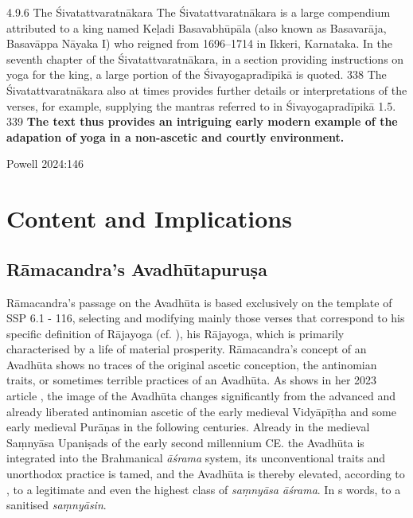 {4.9.6 The Śivatattvaratnākara
The Śivatattvaratnākara is a large compendium attributed to a king named Keḷadi Basavabhūpāla (also
known as Basavarāja, Basavāppa Nāyaka I) who reigned from 1696–1714 in Ikkeri, Karnataka. In the
seventh chapter of the Śivatattvaratnākara, in a section providing instructions on yoga for the king, a
large portion of the Śivayogapradīpikā is quoted. 338 The Śivatattvaratnākara also at times provides
further details or interpretations of the verses, for example, supplying the mantras referred to in
Śivayogapradīpikā 1.5. 339 \textbf{The text thus provides an intriguing early modern example of the adapation of
yoga in a non-ascetic and courtly environment.}

Powell 2024:146

\chapter{Content and Implications}

\section{Rāmacandra's Avadhūtapuruṣa}
\label{avadhutapurusa} 

Rāmacandra's passage on the Avadhūta is based exclusively on the template of SSP 6.1 - 116, selecting and modifying mainly those verses that correspond to his specific definition of Rājayoga (cf. \pageref{intro}), his Rājayoga, which is primarily characterised by a life of material prosperity. Rāmacandra's concept of an Avadhūta shows no traces of the original ascetic conception, the antinomian traits, or sometimes terrible practices of an Avadhūta. As \citeauthor{pudi2023} shows in her 2023 article , the image of the Avadhūta changes significantly from the advanced and already liberated antinomian ascetic of the early medieval Vidyāpīṭha and some early medieval Purāṇas in the following centuries. Already in the medieval Saṃnyāsa Upaniṣads of the early second millennium CE. the Avadhūta is integrated into the Brahmanical \textit{āśrama} system, its unconventional traits and unorthodox practice is tamed, and the Avadhūta is thereby elevated, according to \citeauthor{pudi2023}, to a legitimate and even the highest class of \textit{saṃnyāsa āśrama}. In \citeauthor{pudi2023}s words, to a sanitised \textit{saṃnyāsin}.

}
